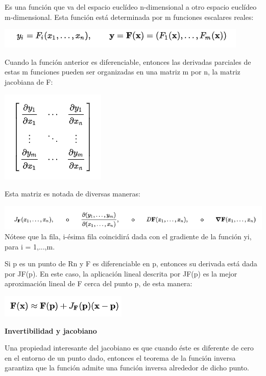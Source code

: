 \documentclass[12pt,letterpaper]{report}
\begin{document}
\begin{center}
\begin{flushleft}
\begin{flushleft}
\begin{center}
\begin{flushleft}
\begin{flushleft}
\begin{center}
\begin{flushleft}
 Es una función que va del espacio euclídeo n-dimensional a otro espacio euclídeo m-dimensional. Esta función está determinada por m funciones escalares reales:
 \begin{center}
 \includegraphics[scale=1]{3.PNG} 
 \begin{flushleft}
 Cuando la función anterior es diferenciable, entonces las derivadas parciales de estas m funciones pueden ser organizadas en una matriz m por n, la matriz jacobiana de F:
 \begin{center}
 \includegraphics[scale=1]{4.PNG} 
 \begin{flushleft}
 Esta matriz es notada de diversas maneras:
 \begin{center}
 \includegraphics[scale=1]{5.PNG} 
 Nótese que la fila, i-ésima fila coincidirá dada con el gradiente de la función yi, para i = 1,...,m.

Si p es un punto de Rn y F es diferenciable en p, entonces su derivada está dada por JF(p). En este caso, la aplicación lineal descrita por JF(p) es la mejor aproximación lineal de F cerca del punto p, de esta manera:
\begin{center}
\includegraphics[scale=1]{6.PNG} 
\begin{flushleft}
\textbf{Invertibilidad y jacobiano}
\begin{flushleft}
Una propiedad interesante del jacobiano es que cuando éste es diferente de cero en el entorno de un punto dado, entonces el teorema de la función inversa garantiza que la función admite una función inversa alrededor de dicho punto.


\end{flushleft}
\end{flushleft}
\end{center}
\end{center}
\end{flushleft}
\end{center}
\end{flushleft}
\end{center}
\end{flushleft}
\end{center}
\end{flushleft}
\end{flushleft}
\end{center}
\end{flushleft}
\end{flushleft}
\end{center}
\end{document}
